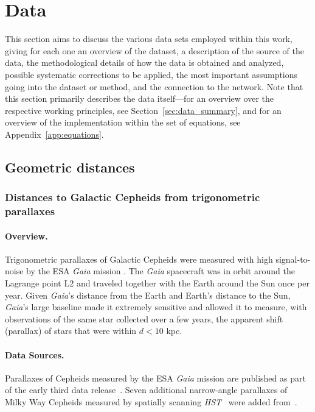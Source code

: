 \section{Data} \label{sec:data_appendix}


This section aims to discuss the various data sets employed within this work, giving for each one an overview of the dataset, a description of the source of the data, the methodological details of how the data is obtained and analyzed, possible systematic corrections to be applied, the most important assumptions going into the dataset or method, and the connection to the network. Note that this section primarily describes the data itself---for an overview over the respective working principles, see Section~\ref{sec:data_summary}, and for an overview of the implementation within the {\DN} set of equations, see Appendix~\ref{app:equations}.

\subsection{Geometric distances} \label{sec:anchors}

\subsubsection{Distances to Galactic Cepheids from trigonometric parallaxes}

\paragraph{Overview.} 
Trigonometric parallaxes of Galactic Cepheids were measured with high signal-to-noise by the ESA \textit{Gaia} mission \citep{2016A&A...595A...1G}. The \textit{Gaia} spacecraft was in orbit around the Lagrange point L2 and traveled together with the Earth around the Sun once per year. Given {\it Gaia}'s distance from the Earth and Earth's distance to the Sun, {\it Gaia}'s large baseline made it extremely sensitive and allowed it to measure, with observations of the same star collected over a few years, the apparent shift (parallax) of stars that were within $d < 10$ kpc.

\paragraph{Data Sources.}
Parallaxes of Cepheids measured by the ESA {\it Gaia} mission are published as part of the early third data release~\citep[GEDR3,][]{2021A&A...649A...1G,2021A&A...649A...2L}. Seven additional narrow-angle parallaxes of Milky Way Cepheids measured by spatially scanning {\it HST}~\citep{2014ApJ...785..161R,2016ApJ...825...11C} were added from~\citet{2018ApJ...855..136R}. 

